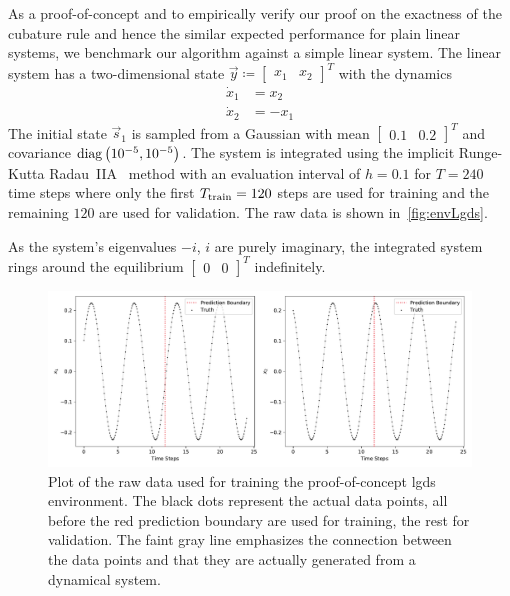 			As a proof-of-concept and to empirically verify our proof on the exactness of the cubature rule and hence the similar expected performance for plain linear systems, we benchmark our algorithm against a simple linear system. The linear system has a two-dimensional state \( \vec{y} \coloneqq \begin{bmatrix} x_1 & x_2 \end{bmatrix}^T \) with the dynamics
			\begin{align*}
				\dot{x}_1 &= x_2 \\
				\dot{x}_2 &= -x_1
			\end{align*}
			The initial state \( \vec{s}_1 \) is sampled from a Gaussian with mean \( \begin{bmatrix} 0.1 & 0.2 \end{bmatrix}^T \) and covariance \( \operatorname{diag}\big(10^{-5}, 10^{-5}\big) \). The system is integrated using the implicit Runge-Kutta Radau~IIA~\cite{guglielmiImplementingRadauIIA2001} method with an evaluation interval of \( h = 0.1 \) for \( T = 240 \) time steps where only the first \( T_{\mathrm{train}} = 120 \) steps are used for training and the remaining \(120\) are used for validation. The raw data is shown in~\autoref{fig:envLgds}.

			As the system's eigenvalues \( -i \), \( i \) are purely imaginary, the integrated system rings around the equilibrium \( \begin{bmatrix} 0 & 0 \end{bmatrix}^T \) indefinitely.

			\begin{figure}
				\centering
				\includegraphics[width=\linewidth]{figures/experiments/environments/observations-lgds-N0.pdf}
				\caption{Plot of the raw data used for training the proof-of-concept \ac{lgds} environment. The black dots represent the actual data points, all before the red prediction boundary are used for training, the rest for validation. The faint gray line emphasizes the connection between the data points and that they are actually generated from a dynamical system.}
				\label{fig:envLgds}
			\end{figure}

